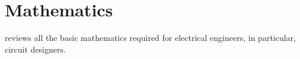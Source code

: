 \cleardoublepage
\chapter{Mathematics}
\label{ch:math}

 reviews all the basic mathematics required for electrical engineers, in particular, circuit designers. 

